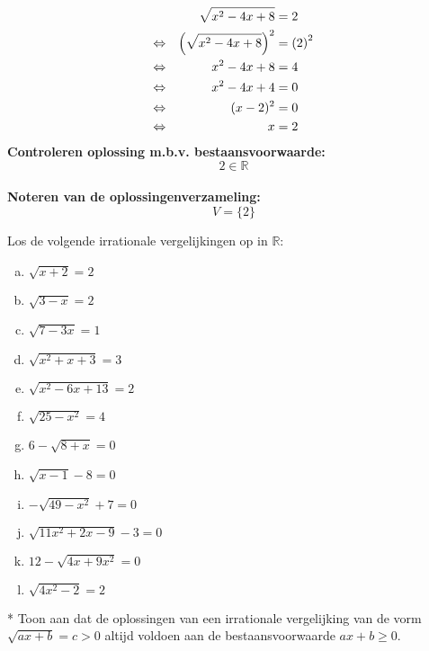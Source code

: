 \documentclass[12pt,twoside]{article}
\begin{document}
\begin{enumerate}[(a)]
  \begin{align*}
         && \sqrt{x^2-4x+8} &= 2 \\
    \Leftrightarrow && \left(\sqrt{x^2-4x+8}\right)^2 &= \left(2\right)^2\\
    \Leftrightarrow && x^2-4x+8 &= 4\\
    \Leftrightarrow && x^2-4x+4 &= 0\\
    \Leftrightarrow && (x-2)^2 &= 0\\
    \Leftrightarrow && x &= 2\\
  \end{align*}
  {\bf Controleren oplossing m.b.v. bestaansvoorwaarde:}\\
  $$2\in\mathbb{R}$$\\
  {\bf Noteren van de oplossingenverzameling:}\\
  $$V=\{2\}$$
\end{enumerate}

\begin{oefening}
Los de volgende irrationale vergelijkingen op in $\mathbb{R}$:
\begin{multicols}{2}
\begin{enumerate}[(a)]
  \item $\sqrt{x+2}=2$
  \item $\sqrt{3-x}=2$
  \item $\sqrt{7-3x}=1$
  \item $\sqrt{x^2+x+3}=3$
  \item $\sqrt{x^2-6x+13}=2$
  \item $\sqrt{25-x^2}=4$
  \item $6-\sqrt{8+x}=0$
  \item $\sqrt{x-1}-8=0$
  \item $-\sqrt{49-x^2}+7=0$
  \item $\sqrt{11x^2+2x-9}-3=0$
  \item $12-\sqrt{4x+9x^2}=0$
  \item $\sqrt{4x^2-2}=2$
\end{enumerate}
\end{multicols}
\end{oefening}

\begin{oefening}* Toon aan dat de oplossingen van een irrationale vergelijking van de vorm $\sqrt{ax+b}=c>0$ altijd voldoen aan de bestaansvoorwaarde $ax+b\geq0$.
\end{oefening}
\end{document}
